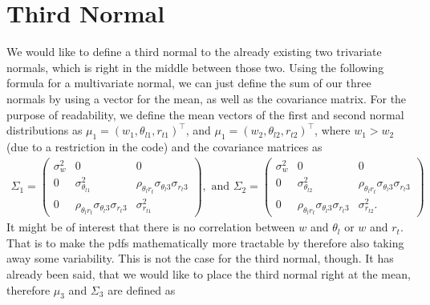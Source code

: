 \section{Third Normal}\label{sec:third_normal}

We would like to define a third normal to the already existing two trivariate normals,
which is right in the middle between those two.
Using the following formula for a multivariate normal,
we can just define the sum of our three normals by using a vector for the mean,
as well as the covariance matrix.
For the purpose of readability,
we define the mean vectors of the first
and second normal distributions as $\mu_1 = (w_1, \theta_{l1}, r_{t1})^\top$,
and $\mu_1 = (w_2, \theta_{l2}, r_{t2})^\top$,
where $w_1 > w_2$ (due to a restriction in the code) and the covariance matrices as
\begin{align*}
    \Sigma_1 =
    \begin{pmatrix}
        \sigma_w^2 & 0                                                      & 0                                                      \\
        0          & \sigma_{\theta_{l1}}^2                                 & \rho_{\theta_l r_t} \sigma_{\theta_l 3} \sigma_{r_t 3} \\
        0          & \rho_{\theta_l r_t} \sigma_{\theta_l 3} \sigma_{r_t 3} & \sigma_{r_{t1}}^2
    \end{pmatrix},
    \text{ and }
    \Sigma_2 =
    \begin{pmatrix}
        \sigma_w^2 & 0                                                      & 0                                                      \\
        0          & \sigma_{\theta_{l2}}^2                                 & \rho_{\theta_l r_t} \sigma_{\theta_l 3} \sigma_{r_t 3} \\
        0          & \rho_{\theta_l r_t} \sigma_{\theta_l 3} \sigma_{r_t 3} & \sigma_{r_{t2}}^2.
    \end{pmatrix}
\end{align*}
It might be of interest that there is no correlation between $w$ and $\theta_l$ or $w$ and $r_t$.
That is to make the \glspl{pdf} mathematically more tractable by therefore also taking away some variability.
This is not the case for the third normal, though.
It has already been said,
that we would like to place the third normal right at the mean,
therefore $\mu_3$ and $\Sigma_3$ are defined as
